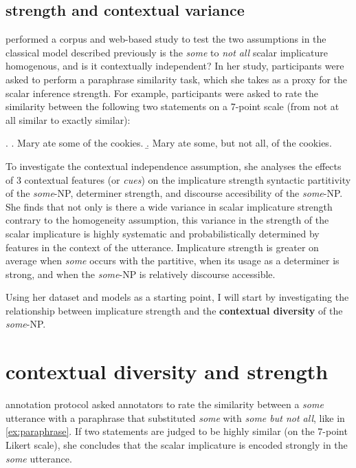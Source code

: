 \documentclass[10pt, biblatex]{report}
\begin{document}
\subsection{strength and contextual variance}

\citet{degen_investigating_2015} performed a corpus and web-based study to
test the two assumptions in the classical model described previously \dash is
the \textit{some} to \textit{not all} scalar implicature {\rmsc homogenous}, and
is it {\rmsc contextually independent}? In her study, participants were asked to
perform a paraphrase similarity task, which she takes as a proxy for the scalar
inference strength. For example, participants were asked to rate the similarity
between the following two statements on a 7-point scale (from not at all similar
to exactly similar):

\ex. \a. Mary ate some of the cookies.
     \b. Mary ate some, but not all, of the cookies.

To investigate the contextual independence assumption, she analyses the effects
of 3 contextual features (or \textit{cues}) on the implicature strength \dash
syntactic partitivity of the \textit{some}-NP, determiner strength, and
discourse accesibility of the \textit{some}-NP. She finds that not only is there
a wide variance in scalar implicature strength contrary to the homogeneity
assumption, this variance in the strength of the scalar implicature is highly
systematic and probabilistically determined by features in the context of the
utterance. Implicature strength is greater on average when \textit{some} occurs
with the partitive, when its usage as a determiner is strong, and when the
\textit{some}-NP is relatively discourse accessible.

Using her dataset and models as a starting point, I will start by investigating
the relationship between implicature strength and the \textbf{contextual
diversity} of the \textit{some}-NP.

\section{contextual diversity and strength}
\label{sec:context}

 annotation protocol asked annotators to
rate the similarity between a \textit{some} utterance with a paraphrase
that substituted \textit{some} with \textit{some but not all}, like in
\ref{ex:paraphrase}. If two statements are judged to be highly similar (on the
7-point Likert scale), she concludes that the scalar implicature is encoded
strongly in the \textit{some} utterance.
\end{document}
